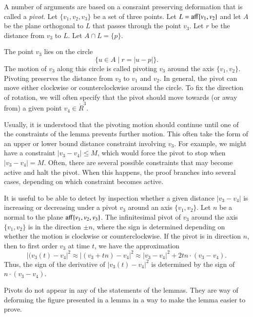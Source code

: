 A number of arguments are based on a consraint preserving deformation
that is called a {\it pivot}.    Let $\{v_1,v_2,v_3\}$ be a set
of three points.  Let $L={\operatorname{aff}}\{v_1,v_2\}$ and let $A$ be
the plane orthogonal to $L$ that passes through the point $v_3$.
Let $r$ be the distance from $v_3$ to $L$.  Let $A\cap L = \{p\}$.

The point $v_3$ lies on the circle
   $$
   \{u \in A \mid r = |u - p|\}.
   $$
The motion of $v_3$ along this circle is called pivoting $v_3$
around the axis $\{v_1,v_2\}$.   Pivoting preserves the distance from
$v_3$ to $v_1$ and $v_2$.   In general, the pivot can move
either clockwise or counterclockwise around the circle.  To fix
the direction of rotation, we will often specify that the pivot
should move towards (or away from) a given point $v_4\in\ring{R}^3$.



Usually, it is understood that the pivoting motion should continue
until one of the constraints of the lemma prevents further motion.
This often take the form of an upper or lower bound distance
constraint involving $v_3$.  For example, we might have a constraint
$|v_3-v_4|\le M$, which would force the pivot to stop when $|v_3-v_4|=M$.
Often, there are several possible constraints that may become active
and halt the pivot.  When this happens, the proof branches into several
cases, depending on which constraint becomes active.

It is useful to be able to detect by inspection whether a given
distance $|v_3-v_4|$ is increasing or decreasing under a pivot $v_3$
around an axis $\{v_1,v_2\}$.  Let $n$ be a normal to the plane
${\operatorname{aff}}\{v_1,v_2,v_3\}$.  The infinitesimal pivot of $v_3$ 
around the axis $\{v_1,v_2\}$ is in the direction $\pm n$, where
the sign is determined depending on whether the motion is clockwise
or counterclockwise.    If the pivot is in direction $n$, 
then to first order $v_3$ at time $t$, we have the approximation
  $$
  |(v_3(t)-v_4|^2 \approx |(v_3+t n)-v_4|^2 
  \approx |v_3-v_4|^2 + 2 t n \cdot (v_3-v_4).
  $$
Thus, the sign of the derivative of $|v_3(t)-v_4|^2$ is determined by the
sign of $n\cdot (v_3-v_4)$.


Pivots do not appear in any of the statements of the lemmas.  They
are way of deforming the figure presented in a lemma in a way to make
the lemma easier to prove.


\newpage



